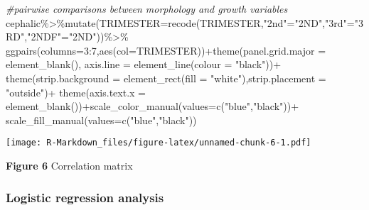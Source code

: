 \documentclass[
]{article}
\newenvironment{Shaded}{\begin{snugshade}}{\end{snugshade}}
\newcommand{\AttributeTok}[1]{\textcolor[rgb]{0.77,0.63,0.00}{#1}}
\newcommand{\CommentTok}[1]{\textcolor[rgb]{0.56,0.35,0.01}{\textit{#1}}}
\newcommand{\DecValTok}[1]{\textcolor[rgb]{0.00,0.00,0.81}{#1}}
\newcommand{\FunctionTok}[1]{\textcolor[rgb]{0.00,0.00,0.00}{#1}}
\newcommand{\NormalTok}[1]{#1}
\newcommand{\OtherTok}[1]{\textcolor[rgb]{0.56,0.35,0.01}{#1}}
\newcommand{\SpecialCharTok}[1]{\textcolor[rgb]{0.00,0.00,0.00}{#1}}
\newcommand{\StringTok}[1]{\textcolor[rgb]{0.31,0.60,0.02}{#1}}
\begin{document}
\begin{Shaded}
\begin{Highlighting}[]
\CommentTok{\#pairwise comparisons between morphology and growth variables}
\NormalTok{cephalic}\SpecialCharTok{\%\textgreater{}\%}\FunctionTok{mutate}\NormalTok{(}\AttributeTok{TRIMESTER=}\FunctionTok{recode}\NormalTok{(TRIMESTER,}\StringTok{"2nd"}\OtherTok{=}\StringTok{"2ND"}\NormalTok{,}\StringTok{"3rd"}\OtherTok{=}\StringTok{"3RD"}\NormalTok{,}\StringTok{"2NDF"}\OtherTok{=}\StringTok{"2ND"}\NormalTok{))}\SpecialCharTok{\%\textgreater{}\%}
  \FunctionTok{ggpairs}\NormalTok{(}\AttributeTok{columns=}\DecValTok{3}\SpecialCharTok{:}\DecValTok{7}\NormalTok{,}\FunctionTok{aes}\NormalTok{(}\AttributeTok{col=}\NormalTok{TRIMESTER))}\SpecialCharTok{+}\FunctionTok{theme}\NormalTok{(}\AttributeTok{panel.grid.major =} \FunctionTok{element\_blank}\NormalTok{(),}
  \AttributeTok{axis.line =} \FunctionTok{element\_line}\NormalTok{(}\AttributeTok{colour =} \StringTok{"black"}\NormalTok{))}\SpecialCharTok{+}
  \FunctionTok{theme}\NormalTok{(}\AttributeTok{strip.background =} \FunctionTok{element\_rect}\NormalTok{(}\AttributeTok{fill =} \StringTok{"white"}\NormalTok{),}\AttributeTok{strip.placement =} \StringTok{"outside"}\NormalTok{)}\SpecialCharTok{+}
  \FunctionTok{theme}\NormalTok{(}\AttributeTok{axis.text.x =} \FunctionTok{element\_blank}\NormalTok{())}\SpecialCharTok{+}\FunctionTok{scale\_color\_manual}\NormalTok{(}\AttributeTok{values=}\FunctionTok{c}\NormalTok{(}\StringTok{"blue"}\NormalTok{,}\StringTok{"black"}\NormalTok{))}\SpecialCharTok{+}
  \FunctionTok{scale\_fill\_manual}\NormalTok{(}\AttributeTok{values=}\FunctionTok{c}\NormalTok{(}\StringTok{"blue"}\NormalTok{,}\StringTok{"black"}\NormalTok{))}
\end{Highlighting}
\end{Shaded}

\texttt{[image: R-Markdown\_files/figure-latex/unnamed-chunk-6-1.pdf]}

\textbf{Figure 6} Correlation matrix

\hypertarget{logistic-regression-analysis}{%
\subsubsection{\texorpdfstring{\textbf{Logistic regression
analysis}}{Logistic regression analysis}}\label{logistic-regression-analysis}}
\end{document}
